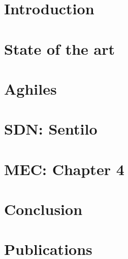 \documentclass[a4paper, 12pt, twoside,openright]{report}
\begin{document}

\firstpage

\preface
		
		
		

\body
	\chapter{Introduction}
	\minitoc
		

	\chapter{State of the art \cite{bregell_hardware_2015}}
	\minitoc
		
		
		
		
		

	\chapter{Aghiles \cite{bregell_hardware_2015}}
	\minitoc
		
		
		
		
		
		

	\chapter{SDN: Sentilo \cite{_contiki_2016a}}
	\minitoc
		
		
		
		
		
		

	\chapter{MEC: Chapter 4}
	\minitoc
		
		
		
		
		
		
		
	\chapter{Conclusion}
	\minitoc
		
	
	\chapter{Publications}
	\minitoc
		
\end{document}
